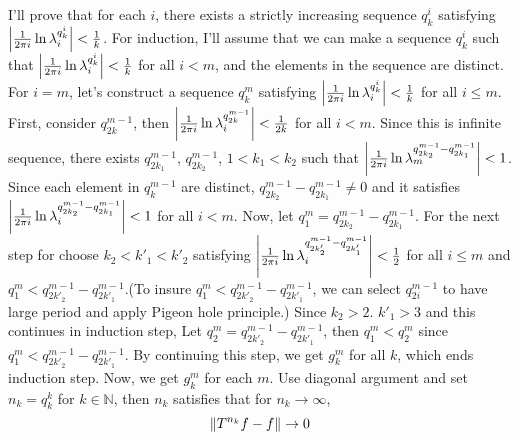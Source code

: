 \documentclass[12pt]{article}
\begin{document}
I'll prove that for each $i$, there exists a strictly increasing sequence $q^i_k$ satisfying $\abs{\frac{1}{2\pi i}\ln\lambda_i^{q^i_k}}<\frac{1}{k}$. For induction, I'll assume that we can make a sequence $q^i_k$ such that $\abs{\frac{1}{2\pi i}\ln\lambda_i^{q^i_k}}<\frac{1}{k}$ for all $i<m$, and the elements in the sequence are distinct. For $i=m$, let's construct a sequence $q^m_k$ satisfying $\abs{\frac{1}{2\pi i}\ln\lambda_i^{q^i_k}}<\frac{1}{k}$ for all $i\leq m$. First, consider $q^{m-1}_{2k}$, then $\abs{\frac{1}{2\pi i}\ln\lambda_i^{q^{m-1}_{2k}}}<\frac{1}{2k}$ for all $i<m$. Since this is infinite sequence, there exists $q^{m-1}_{2k_1}$, $q^{m-1}_{2k_2}$, $1<k_1< k_2$ such that $\abs{\frac{1}{2\pi i}\ln\lambda_m^{q^{m-1}_{2k_2}-q^{m-1}_{2k_1}}}<1$. Since each element in $q^{m-1}_k$ are distinct, $q^{m-1}_{2k_2}-q^{m-1}_{2k_1}\neq 0$ and it satisfies $\abs{\frac{1}{2\pi i}\ln\lambda_i^{q^{m-1}_{2k_2}-q^{m-1}_{2k_1}}}<1$ for all $i<m$. Now, let $q^m_1=q^{m-1}_{2k_2}-q^{m-1}_{2k_1}$. For the next step for choose $k_2<k'_1<k'_2$ satisfying $\abs{\frac{1}{2\pi i}\ln\lambda_i^{q^{m-1}_{2k'_2}-q^{m-1}_{2k'_1}}}<\frac{1}{2}$ for all $i\leq m$ and $q^m_1< q^{m-1}_{2k'_2}-q^{m-1}_{2k'_1}$.(To insure $q^m_1< q^{m-1}_{2k'_2}-q^{m-1}_{2k'_1}$, we can select $q^{m-1}_{2i}$ to have large period and apply Pigeon hole principle.) Since $k_2>2$. $k'_1>3$ and this continues in induction step, Let $q^m_2=q^{m-1}_{2k'_2}-q^{m-1}_{2k'_1}$, then $q^m_1<q^m_2$ since $q^m_1< q^{m-1}_{2k'_2}-q^{m-1}_{2k'_1}$. By continuing this step, we get $g^m_k$ for all $k$, which ends induction step.
Now, we get $g^m_k$ for each $m$. Use diagonal argument and set $n_k=q^k_k$ for $k\in \mathbb{N}$, then $n_k$ satisfies that for $n_k\rightarrow\infty$,
\begin{equation*}
    \norm{T^{n_k}f-f}\rightarrow 0
\end{equation*}
\end{document}
